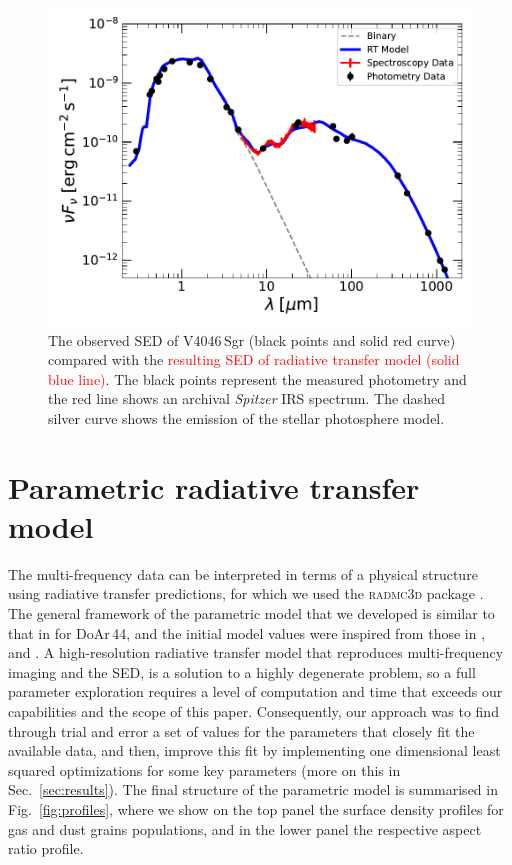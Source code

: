 \documentclass[fleqn,usenatbib,useAMS]{mnras}
\newcommand{\red}[1]{\textcolor{red}{#1}}
\begin{document}
\begin{figure}
	\centering
	\includegraphics[width=\columnwidth]{SED_.pdf}
    \caption{The observed SED of V4046\,Sgr (black points and solid red curve) compared with the \red{resulting SED of radiative transfer model (solid blue line)}. The black points represent the measured photometry and the red line shows an archival \textit{Spitzer} IRS spectrum. The dashed silver curve shows the emission of the stellar photosphere model.}
    \label{fig:SED}
\end{figure}

\section{Parametric radiative transfer model} \label{sec:model}

The multi-frequency data can be interpreted in terms of a physical structure using radiative transfer predictions, for which we used the \textsc{radmc3d} package \citep[version 2.0,][]{Dullemond_2012}. The general framework of the parametric model that we developed is similar to that in \citet{2018MNRAS.477.5104C} for DoAr\,44, and the initial model values were inspired from those in \citet{Rosenfeld_2013}, \citet{Ru_z_Rodr_guez_2019} and \citet{2019ApJ...882..160Q}. A high-resolution radiative transfer model that reproduces multi-frequency imaging and the SED, is a solution to a highly degenerate problem, so a full parameter exploration requires a level of computation and time that exceeds our capabilities and the scope of this paper. Consequently, our approach was to find through trial and error a set of values for the parameters that closely fit the available data, and then, improve this fit by implementing one dimensional least squared optimizations for some key parameters (more on this in Sec.~\ref{sec:results}). The final structure of the parametric model is summarised in Fig.~\ref{fig:profiles}, where we show on the top panel the surface density profiles for gas and dust grains populations, and in the lower panel the respective aspect ratio profile.
\end{document}
